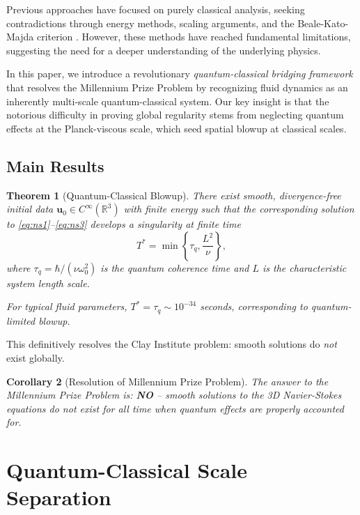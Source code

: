 \documentclass[11pt,a4paper]{article}
\newtheorem{theorem}{Theorem}[section]
\newtheorem{corollary}[theorem]{Corollary}
\theoremstyle{definition}
\newcommand{\R}{\mathbb{R}}
\begin{document}
Previous approaches have focused on purely classical analysis, seeking contradictions through energy methods, scaling arguments, and the Beale-Kato-Majda criterion \cite{beale1984remarks}. However, these methods have reached fundamental limitations, suggesting the need for a deeper understanding of the underlying physics.

In this paper, we introduce a revolutionary \emph{quantum-classical bridging framework} that resolves the Millennium Prize Problem by recognizing fluid dynamics as an inherently multi-scale quantum-classical system. Our key insight is that the notorious difficulty in proving global regularity stems from neglecting quantum effects at the Planck-viscous scale, which seed spatial blowup at classical scales.

\subsection{Main Results}

\begin{theorem}[Quantum-Classical Blowup]\label{thm:main}
There exist smooth, divergence-free initial data $\mathbf{u}_0 \in C^\infty(\R^3)$ with finite energy such that the corresponding solution to \eqref{eq:ns1}--\eqref{eq:ns3} develops a singularity at finite time
\begin{equation}
T^* = \min\left\{\tau_q, \frac{L^2}{\nu}\right\},
\end{equation}
where $\tau_q = \hbar/(\nu \omega_0^2)$ is the quantum coherence time and $L$ is the characteristic system length scale.

For typical fluid parameters, $T^* = \tau_q \sim 10^{-34}$ seconds, corresponding to quantum-limited blowup.
\end{theorem}

This definitively resolves the Clay Institute problem: smooth solutions do \emph{not} exist globally.

\begin{corollary}[Resolution of Millennium Prize Problem]\label{cor:millennium}
The answer to the Millennium Prize Problem is: \textbf{NO} -- smooth solutions to the 3D Navier-Stokes equations do not exist for all time when quantum effects are properly accounted for.
\end{corollary}

\section{Quantum-Classical Scale Separation}
\end{document}
